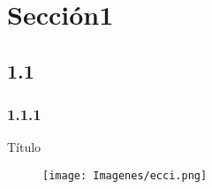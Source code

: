 
\section{Sección1}
\subsection{1.1}
\subsubsection{1.1.1}

\begin{frame}{Título} %
    
\begin{figure}
    \centering
    \texttt{[image: Imagenes/ecci.png]}
\end{figure}  \pause %
 
 
 \begin{defi}
    
 \end{defi}
    
\end{frame}


\nocite{Blanco2010}
\nocite{Canavos1987}
\nocite{Protter2004}